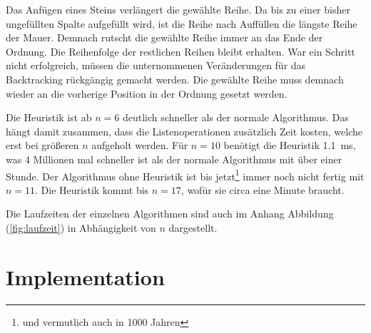 \documentclass[a4paper, 12pt]{scrartcl}
\begin{document}
Das Anfügen eines Steins verlängert die gewählte Reihe. Da bis zu einer bisher ungefüllten Spalte aufgefüllt wird, ist die Reihe nach Auffüllen die längste Reihe der Mauer. Demnach rutscht die gewählte Reihe immer an das Ende der Ordnung. Die Reihenfolge der restlichen Reihen bleibt erhalten. War ein Schritt nicht erfolgreich, müssen die unternommenen Veränderungen für das Backtracking rückgängig gemacht werden. Die gewählte Reihe muss demnach wieder an die vorherige Position in der Ordnung gesetzt werden.

Die Heuristik ist ab $n=6$ deutlich schneller als der normale Algorithmus. Das hängt damit zusammen, dass die Listenoperationen zusätzlich Zeit kosten, welche erst bei größeren $n$ aufgeholt werden. Für $n=10$ benötigt die Heuristik \SI{1.1}{\milli\second}, was 4 Millionen mal schneller ist als der normale Algorithmus mit über einer Stunde. Der Algorithmus ohne Heuristik ist bis jetzt\footnote{und vermutlich auch in 1000 Jahren} immer noch nicht fertig mit $n=11$. Die Heuristik kommt bis $n=17$, wofür sie circa eine Minute braucht.

Die Laufzeiten der einzelnen Algorithmen sind auch im Anhang Abbildung (\ref{fig:laufzeit}) in Abhängigkeit von $n$ dargestellt.
\newpage
\section{Implementation}
\end{document}
